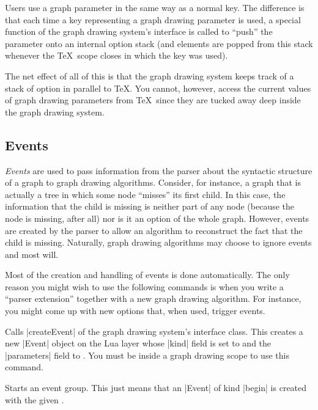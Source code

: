 Users use a graph parameter in the same way as a normal key. The difference is
that each time a key representing a graph drawing parameter is used, a special
function of the graph drawing system's interface is called to ``push'' the
parameter onto an internal option stack (and elements are popped from this
stack whenever the \TeX\ scope closes in which the key was used).

The net effect of all of this is that the graph drawing system keeps track of a
stack of option in parallel to \TeX. You cannot, however, access the current
values of graph drawing parameters from \TeX\ since they are tucked away deep
inside the graph drawing system.


\subsection{Events}

\emph{Events} are used to pass information from the parser about the syntactic
structure of a graph to graph drawing algorithms. Consider, for instance, a
graph that is actually a tree in which some node ``misses'' its first child. In
this case, the information that the child is missing is neither part of any
node (because the node is missing, after all) nor is it an option of the whole
graph. However, events are created by the parser to allow an algorithm to
reconstruct the fact that the child is missing. Naturally, graph drawing
algorithms may choose to ignore events and most will.

Most of the creation and handling of events is done automatically. The only
reason you might wish to use the following commands is when you write a
``parser extension'' together with a new graph drawing algorithm. For instance,
you might come up with new options that, when used, trigger events.

\begin{command}{\pgfgdevent{}}
    Calls |createEvent| of the graph drawing system's interface class. This
    creates a new |Event| object on the Lua layer whose |kind| field is set to
     and the |parameters| field to . You must be
    inside a graph drawing scope to use this command.
\end{command}

\begin{command}{\pgfgdbegineventgroup{}}
    Starts an event group. This just means that an |Event| of kind |begin| is
    created with the given .
\end{command}


